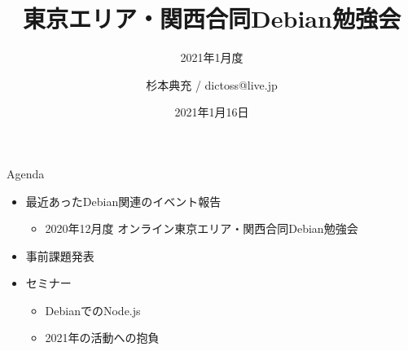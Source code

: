 \title{東京エリア・関西合同Debian勉強会}
\subtitle{2021年1月度} %
\author{杉本典充 / dictoss@live.jp}
\date{2021年1月16日}



\begin{frame}
\titlepage{}
\end{frame}

\begin{frame}{Agenda}
 \begin{minipage}[t]{0.45\hsize}
  \begin{itemize}
  \item 最近あったDebian関連のイベント報告
    \begin{itemize}
    \item 2020年12月度 オンライン東京エリア・関西合同Debian勉強会
    \end{itemize}
  \item 事前課題発表
  \end{itemize}
 \end{minipage}
 \begin{minipage}[t]{0.45\hsize}
   \begin{itemize}
   \item セミナー
     \begin{itemize}
     \item DebianでのNode.js
     \item 2021年の活動への抱負
     \end{itemize}
  \end{itemize}
 \end{minipage}
\end{frame}

